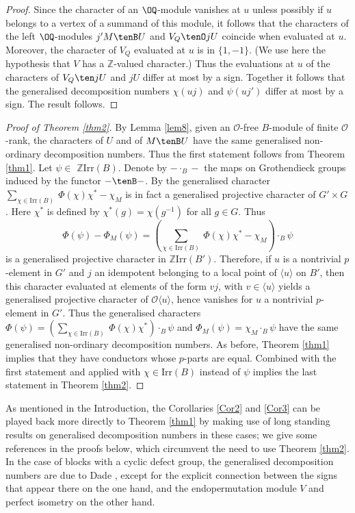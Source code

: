 \documentclass{amsart} %
\theoremstyle{plain}\newtheorem{Theorem}{Theorem}[section]
\theoremstyle{plain}\newtheorem{Conjecture}[Theorem]{Conjecture}
\theoremstyle{plain}\newtheorem{Corollary}[Theorem]{Corollary}
\theoremstyle{plain}\newtheorem{Lemma}[Theorem]{Lemma}
\theoremstyle{plain}\newtheorem{Proposition}[Theorem]{Proposition}
\theoremstyle{definition}\newtheorem{Definition}[Theorem]{Definition}
\theoremstyle{definition}\newtheorem{Example}[Theorem]{Example}
\theoremstyle{definition}\newtheorem{Examples}[Theorem]{Examples}
\theoremstyle{definition}\newtheorem{Remark}[Theorem]{Remark}
\theoremstyle{definition}\newtheorem{Remarks}[Theorem]{Remarks}
\theoremstyle{plain}\newtheorem{Statement}[Theorem]{}
\def\CO{{\mathcal{O}}}
\def\Z{{\mathbb Z}}
\def\Irr{\mathrm{Irr}}           \def\tenK{\otimes_K}
\begin{document}
\begin{proof}
Since the character of an $\OQ$-module vanishes at $u$ unless possibly
if $u$ belongs to a vertex of a summand of this module, it follows that
the characters of the left $\OQ$-modules $j'M\tenB U$ and
$V_Q\tenO jU$ coincide when evaluated at $u$. Moreover, the character of $V_Q$
evaluated at $u$ is in $\{1,-1\}$. (We use here the hypothesis that $V$  has a 
$\Z$-valued character.) Thus the evaluations at $u$ of the characters
of $V_Q\ten jU$ and $jU$ differ at most by a sign.
Together it follows that the generalised decomposition numbers
$\chi(uj)$ and $\psi(uj')$   differ at most by a sign. The result follows.
\end{proof}


\begin{proof}[Proof of Theorem \ref{thm2}]
By Lemma \ref{lem8},  given an $\CO$-free $B$-module of finite
$\CO$-rank, the characters of $U$ and of $M\tenB U$ have the same
generalised non-ordinary decomposition numbers. Thus the first
statement follows from Theorem \ref{thm1}.
Let $\psi\in$ $\Z\Irr(B)$.  Denote by $-\cdot_B-$ the maps on Grothendieck
groups induced by the functor $-\tenB-$. 
By \cite[Proposition 3.3]{KL10} the generalised character
 $\sum_{\chi\in\Irr(B)}\ \Phi(\chi) \chi^*  - \chi_M$ is in fact a generalised
projective character of $G'\times G$. Here $\chi^*$ is defined by
$\chi^*(g)=\chi(g^{-1})$ for all $g\in G$. 
Thus  
$$\Phi(\psi)-\Phi_M(\psi) = (\sum_{\chi\in\Irr(B)}\ \Phi(\chi) \chi^*  - \chi_M)\cdot_B \psi$$
is a generalised projective character in $\Z\Irr(B')$. 
Therefore, if $u$ is a nontrivial $p$-element in $G'$ and $j$ an idempotent belonging to
a local point of $\langle u\rangle$ on $B'$, then this character evaluated at elements
of the form $vj$, with $v\in \langle u\rangle$ 
yields a generalised projective character of $\CO\langle u\rangle$, hence vanishes
for $u$ a nontrivial $p$-element in $G'$. Thus the generalised characters
$\Phi(\psi)=(\sum_{\chi\in\Irr(B)}\ \Phi(\chi) \chi^*)\cdot_B \psi$ and
$\Phi_M(\psi) = \chi_M\cdot_B \psi$ have the same generalised non-ordinary
decomposition numbers. As before, Theorem \ref{thm1} implies that they have 
conductors whose $p$-parts are equal.
Combined with the first statement and 
applied with $\chi\in\Irr(B)$ instead of $\psi$  implies 
the last statement in Theorem \ref{thm2}.
\end{proof}

As mentioned in the Introduction, the Corollaries \ref{Cor2} and \ref{Cor3}
can  be played back more directly to Theorem \ref{thm1} by making use of
long standing results on generalised decomposition numbers in these cases;
we give some references in the proofs below, which circumvent the need to use 
Theorem \ref{thm2}. In the case of blocks with a cyclic defect group, the 
generalised decomposition numbers are due to Dade \cite{Dadecyclic}, 
except for the explicit connection between the signs that appear there on the one hand, 
and the endopermutation module $V$ and perfect isometry on the other hand.
\end{document}
